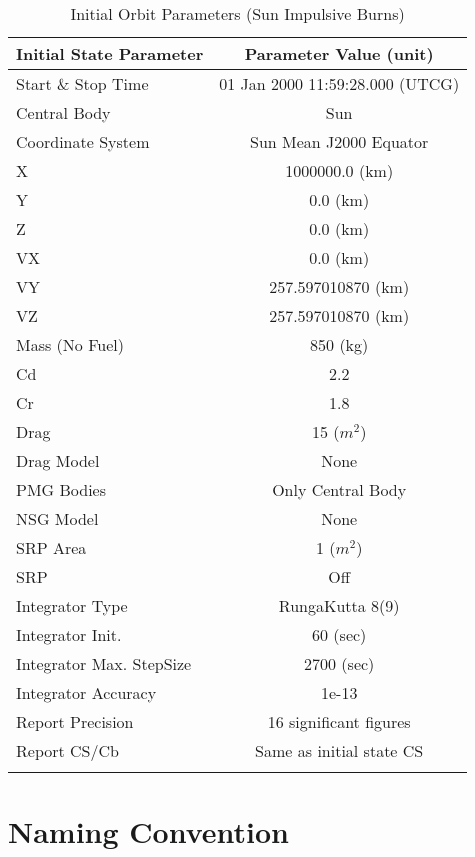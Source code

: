 \begin{table}[htbp!]
\centering \caption{Initial Orbit Parameters (Sun Impulsive Burns)}
      \begin{tabular}{lc}
      \hline\hline
            Initial State Parameter & Parameter Value (unit)\\
            \hline
            Start \& Stop Time & 01 Jan 2000 11:59:28.000 (UTCG)\\
            Central Body & Sun\\
            Coordinate System & Sun Mean J2000 Equator\\
            X & 1000000.0 (km)\\
            Y & 0.0 (km)\\
            Z & 0.0 (km)\\
            VX & 0.0 (km)\\
            VY & 257.597010870 (km)\\
            VZ & 257.597010870 (km)\\
            Mass (No Fuel) & 850 (kg)\\
            Cd & 2.2\\
            Cr & 1.8\\
            Drag & 15 ($m^2$)\\
            Drag Model & None\\
            PMG Bodies & Only Central Body\\
            NSG Model & None\\
            SRP Area & 1 ($m^2$)\\
            SRP & Off\\
            Integrator Type & RungaKutta 8(9)\\
            Integrator Init. & 60 (sec)\\
            Integrator Max. StepSize & 2700 (sec)\\
            Integrator Accuracy & 1e-13\\
            Report Precision & 16 significant figures\\
            Report CS/Cb & Same as initial state CS\\
      \hline\hline
      \label{Table: InitDVStateSunImpulse}
\end{tabular}
\end{table}

\clearpage
\section{Naming Convention}


